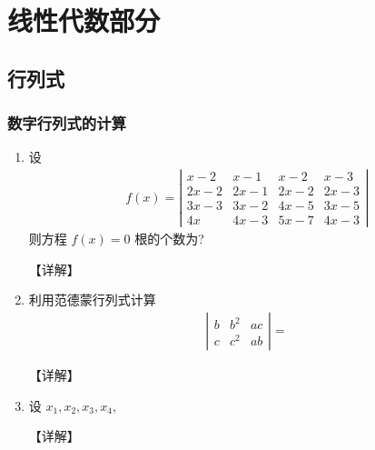 \documentclass[12pt, a4paper, oneside, UTF8]{ctexbook}
\begin{document}
% 
\else
\fi

\chapter{线性代数部分}

\section{行列式}

\subsection{数字行列式的计算}

\begin{enumerate}[label=\arabic*.]
    \item 设
    \begin{align*}
    f(x)=\left|\begin{array}{lllll}
    x-2 & x-1 & x-2 & x-3 \\
    2 x-2 & 2 x-1 & 2 x-2 & 2 x-3 \\
    3 x-3 & 3 x-2 & 4 x-5 & 3 x-5 \\
    4 x & 4 x-3 & 5 x-7 & 4 x-3
    \end{array}\right|
    \end{align*}
    则方程 $f(x)=0$ 根的个数为?    
    \begin{solution}
    【详解】
    \end{solution}
    
    \item 利用范德蒙行列式计算 
    \begin{align*}
    \left|\begin{array}{lll}
    b & b^2 & a c \\
    c & c^2 & a b
    \end{array}\right|=
    \end{align*}
    
    \begin{solution}
    【详解】
    \end{solution}
    
    \item 设 $x_1, x_2, x_3, x_4$,
    
    \begin{solution}
    【详解】
    \end{solution}
    

\end{enumerate}
\end{document}
